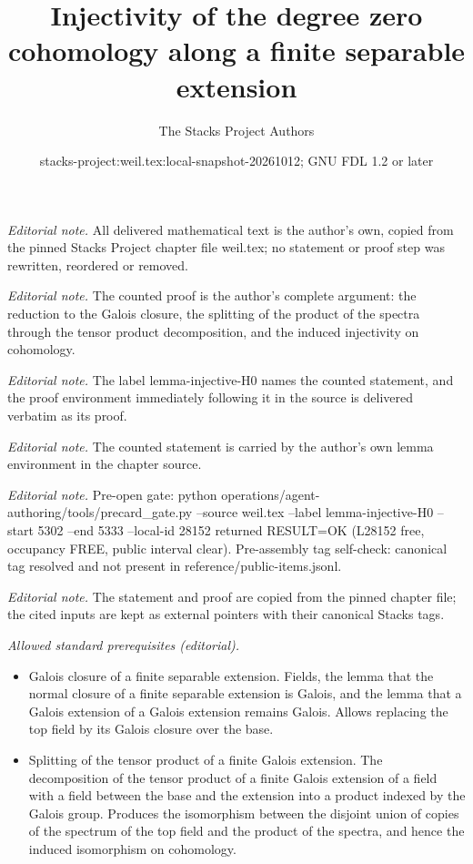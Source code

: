 \documentclass[10pt,a4paper]{amsart}
\title{Injectivity of the degree zero cohomology along a finite separable extension}
\author{The Stacks Project Authors}
\date{stacks-project:weil.tex:local-snapshot-20261012; GNU FDL 1.2 or later}
\theoremstyle{plain}
\theoremstyle{definition}
\theoremstyle{remark}
\numberwithin{equation}{subsection}
\begin{document}
\maketitle
\noindent\textit{Editorial note.} All delivered mathematical text is the author's own, copied from the pinned Stacks Project chapter file weil.tex; no statement or proof step was rewritten, reordered or removed.\par\medskip
\noindent\textit{Editorial note.} The counted proof is the author's complete argument: the reduction to the Galois closure, the splitting of the product of the spectra through the tensor product decomposition, and the induced injectivity on cohomology.\par\medskip
\noindent\textit{Editorial note.} The label lemma-injective-H0 names the counted statement, and the proof environment immediately following it in the source is delivered verbatim as its proof.\par\medskip
\noindent\textit{Editorial note.} The counted statement is carried by the author's own lemma environment in the chapter source.\par\medskip
\noindent\textit{Editorial note.} Pre-open gate: python operations/agent-authoring/tools/precard\_gate.py --source weil.tex --label lemma-injective-H0 --start 5302 --end 5333 --local-id 28152 returned RESULT=OK (L28152 free, occupancy FREE, public interval clear). Pre-assembly tag self-check: canonical tag resolved and not present in reference/public-items.jsonl.\par\medskip
\noindent\textit{Editorial note.} The statement and proof are copied from the pinned chapter file; the cited inputs are kept as external pointers with their canonical Stacks tags.\par\medskip
\noindent\textit{Allowed standard prerequisites (editorial).}\begin{itemize}
\item Galois closure of a finite separable extension. Fields, the lemma that the normal closure of a finite separable extension is Galois, and the lemma that a Galois extension of a Galois extension remains Galois. Allows replacing the top field by its Galois closure over the base.
\item Splitting of the tensor product of a finite Galois extension. The decomposition of the tensor product of a finite Galois extension of a field with a field between the base and the extension into a product indexed by the Galois group. Produces the isomorphism between the disjoint union of copies of the spectrum of the top field and the product of the spectra, and hence the induced isomorphism on cohomology.
\end{itemize}\medskip
\end{document}
